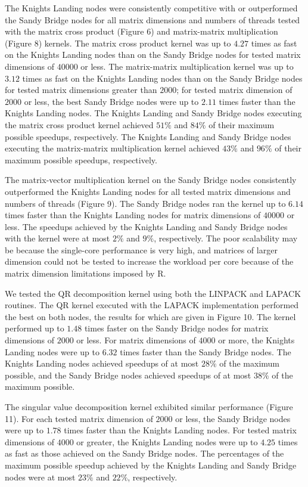 The Knights Landing nodes were consistently competitive with or outperformed the
  Sandy Bridge nodes for all matrix dimensions and numbers of threads tested
  with the matrix cross product (Figure 6) and matrix-matrix multiplication
  (Figure 8) kernels.
The matrix cross product kernel was up to $4.27$ times as fast on the Knights
  Landing nodes than on the Sandy Bridge nodes for tested matrix dimensions of
  $40000$ or less.
The matrix-matrix multiplication kernel was up to $3.12$ times as fast on the
  Knights Landing nodes than on the Sandy Bridge nodes for tested matrix
  dimensions greater than $2000$; for tested matrix dimension of $2000$ or less,
  the best Sandy Bridge nodes were up to $2.11$ times faster than the Knights
  Landing nodes.
The Knights Landing and Sandy Bridge nodes executing the matrix cross product
  kernel achieved $51\%$ and $84\%$ of their maximum possible speedups,
  respectively.
The Knights Landing and Sandy Bridge nodes executing the matrix-matrix
  multiplication kernel achieved $43\%$ and $96\%$ of their maximum possible
  speedups, respectively.

The matrix-vector multiplication kernel on the Sandy Bridge nodes consistently
  outperformed the Knights Landing nodes for all tested matrix dimensions and
  numbers of threads (Figure 9).
The Sandy Bridge nodes ran the kernel up to $6.14$ times faster than the
  Knights Landing nodes for matrix dimensions of $40000$ or less.
The speedups achieved by the Knights Landing and Sandy Bridge nodes with the
  kernel were at most $2\%$ and $9\%$, respectively.
The poor scalability may be because the single-core performance is very high,
  and matrices of larger dimension could not be tested to increase the workload
  per core because of the matrix dimension limitations imposed by R.

We tested the QR decomposition kernel using both the LINPACK and LAPACK
  routines.
The QR kernel executed with the LAPACK implementation performed the best on both
  nodes, the results for which are given in Figure 10.
The kernel performed up to $1.48$ times faster on the Sandy Bridge nodes for
  matrix dimensions of $2000$ or less.
For matrix dimensions of $4000$ or more, the Knights Landing nodes were up to
  $6.32$ times faster than the Sandy Bridge nodes.
The Knights Landing nodes achieved speedups of at most $28\%$ of the maximum
  possible, and the Sandy Bridge nodes achieved speedups of at most $38\%$ of
  the maximum possible.

The singular value decomposition kernel exhibited similar performance
  (Figure 11).
For each tested matrix dimension of $2000$ or less, the Sandy Bridge nodes were
  up to $1.78$ times faster than the Knights Landing nodes.
For tested matrix dimensions of $4000$ or greater, the Knights Landing nodes
  were up to $4.25$ times as fast as those achieved on the Sandy Bridge nodes.
The percentages of the maximum possible speedup achieved by the Knights Landing
  and Sandy Bridge nodes were at most $23\%$ and $22\%$, respectively.

